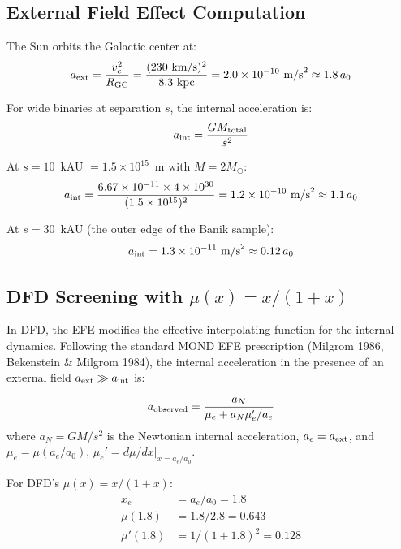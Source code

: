 \documentclass[11pt,a4paper]{article}
\begin{document}
\subsection{External Field Effect Computation}

The Sun orbits the Galactic center at:
\begin{equation}
a_{\rm ext} = \frac{v_c^2}{R_{\rm GC}} = \frac{(230~\text{km/s})^2}
{8.3~\text{kpc}} = 2.0 \times 10^{-10}~\text{m/s}^2 \approx 1.8\,a_0
\end{equation}

For wide binaries at separation $s$, the internal acceleration is:
\begin{equation}
a_{\rm int} = \frac{G M_{\rm total}}{s^2}
\end{equation}

At $s = 10$~kAU $= 1.5 \times 10^{15}$~m with $M = 2 M_\odot$:
\begin{equation}
a_{\rm int} = \frac{6.67 \times 10^{-11} \times 4 \times 10^{30}}
{(1.5 \times 10^{15})^2} = 1.2 \times 10^{-10}~\text{m/s}^2
\approx 1.1\,a_0
\end{equation}

At $s = 30$~kAU (the outer edge of the Banik sample):
\begin{equation}
a_{\rm int} = 1.3 \times 10^{-11}~\text{m/s}^2 \approx 0.12\,a_0
\end{equation}

\subsection{DFD Screening with $\mu(x) = x/(1+x)$}

In DFD, the EFE modifies the effective interpolating function for the
internal dynamics. Following the standard MOND EFE prescription
(Milgrom 1986, Bekenstein \& Milgrom 1984), the internal acceleration
in the presence of an external field $a_{\rm ext} \gg a_{\rm int}$ is:

\begin{equation}
a_{\rm observed} = \frac{a_N}{\mu_e + a_N \mu_e'/ a_e}
\end{equation}
where $a_N = G M / s^2$ is the Newtonian internal acceleration,
$a_e = a_{\rm ext}$, and $\mu_e = \mu(a_e / a_0)$,
$\mu_e' = d\mu/dx |_{x = a_e/a_0}$.

For DFD's $\mu(x) = x/(1+x)$:
\begin{align}
x_e &= a_e / a_0 = 1.8 \\
\mu(1.8) &= 1.8/2.8 = 0.643 \\
\mu'(1.8) &= 1/(1+1.8)^2 = 0.128
\end{align}
\end{document}
